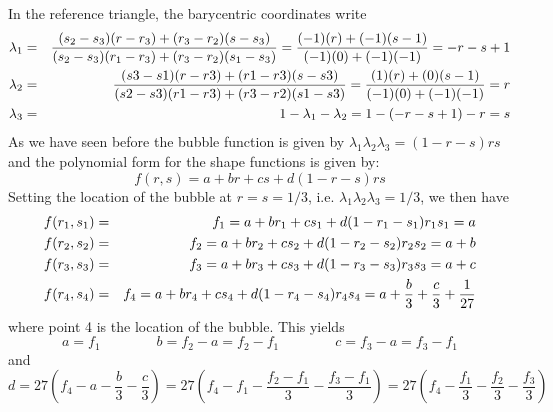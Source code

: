 In the reference triangle, the barycentric coordinates write
\begin{eqnarray}
\lambda_1 &=& \frac{(s_2-s_3)(r-r_3)+(r_3-r_2)(s-s_3)}{(s_2-s_3)(r_1-r_3)+(r_3-r_2)(s_1-s_3)} = \frac{(-1)(r)+(-1)(s-1)}{(-1)(0)+(-1)(-1)} = -r-s+1  \nonumber\\
\lambda_2 &=& \frac{(s3-s1)(r-r3)+(r1-r3)(s-s3)}{(s2-s3)(r1-r3)+(r3-r2)(s1-s3)} = \frac{(1)(r)+(0)(s-1)}{(-1)(0)+(-1)(-1)} = r \nonumber\\
\lambda_3 &=& 1-\lambda_1-\lambda_2 = 1 - (-r-s+1) - r = s \nonumber
\end{eqnarray}
As we have seen before the bubble function is given by $\lambda_1\lambda_2\lambda_3 = (1-r-s)rs$
and the polynomial form for the shape functions is given by:
\[
f(r,s) =a+br+cs + d (1-r-s)rs
\]
Setting the location of the bubble at $r=s=1/3$, i.e. $\lambda_1\lambda_2\lambda_3 = 1/3$, 
we then have 
\begin{eqnarray}
f(r_1,s_1)&=&f_1 = a+br_1+cs_1 + d (1-r_1-s_1)r_1s_1 = a \nonumber\\
f(r_2,s_2)&=&f_2 = a+br_2+cs_2 + d (1-r_2-s_2)r_2s_2 = a + b \nonumber\\
f(r_3,s_3)&=&f_3 = a+br_3+cs_3 + d (1-r_3-s_3)r_3s_3 = a + c \nonumber\\
f(r_4,s_4)&=&f_4 = a+br_4+cs_4 + d (1-r_4-s_4)r_4s_4 = a + \frac{b}{3} + \frac{c}{3} + \frac{1}{27} \nonumber
\end{eqnarray}
where point 4 is the location of the bubble.
This yields
\[
a=f_1 
\quad\quad\qquad
b=f_2-a = f_2-f_1
\quad\quad\qquad
c=f_3-a = f_3-f_1
\]
and
\[
d=27(f_4-a-\frac{b}{3} - \frac{c}{3}) = 27 (f_4 - f_1 - \frac{f_2-f_1}{3} - \frac{f_3-f_1}{3} )
=27(f_4 - \frac{f_1}{3}  - \frac{f_2}{3}  - \frac{f_3}{3} )
\] 

